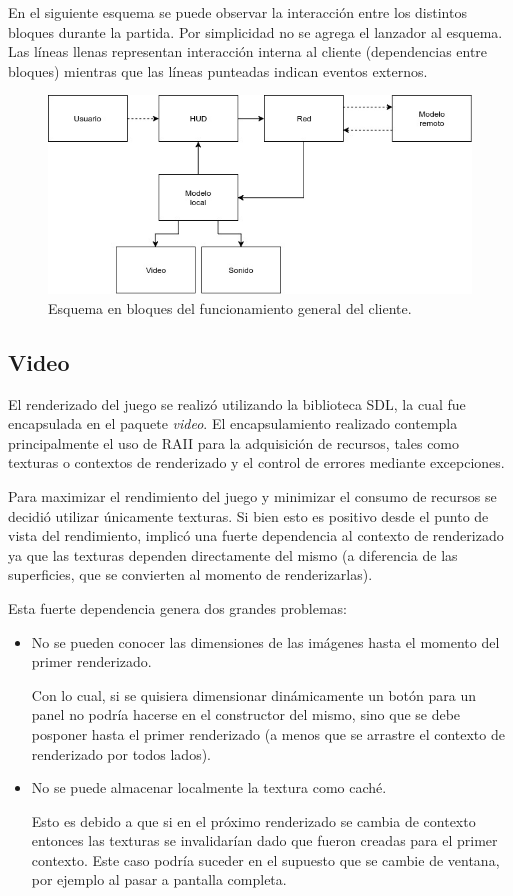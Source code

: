 \documentclass[titlepage,a4paper,12pt]{article}
\begin{document}
En el siguiente esquema se puede observar la interacción entre los distintos bloques durante la partida. Por simplicidad no se agrega el lanzador al esquema. Las líneas llenas representan interacción interna al cliente (dependencias entre bloques) mientras que las líneas punteadas indican eventos externos.
\begin{figure}[H]
	\centering
	\includegraphics[width=16cm]{../imagenes/esquema-bloques-cliente.jpg}
	\caption{\label{fig:esquema-bloques-cliente} Esquema en bloques del funcionamiento general del cliente.}
\end{figure}

\subsection{Video}
El renderizado del juego se realizó utilizando la biblioteca SDL, la cual fue encapsulada en el paquete \textit{video}. El encapsulamiento realizado contempla principalmente el uso de RAII para la adquisición de recursos, tales como texturas o contextos de renderizado y el control de errores mediante excepciones.

Para maximizar el rendimiento del juego y minimizar el consumo de recursos se decidió utilizar únicamente texturas. Si bien esto es positivo desde el punto de vista del rendimiento, implicó una fuerte dependencia al contexto de renderizado ya que las texturas dependen directamente del mismo (a diferencia de las superficies, que se convierten al momento de renderizarlas).  

Esta fuerte dependencia genera dos grandes problemas:
\begin{itemize}
\item No se pueden conocer las dimensiones de las imágenes hasta el momento del primer renderizado.

Con lo cual, si se quisiera dimensionar dinámicamente un botón para un panel no podría hacerse en el constructor del mismo, sino que se debe posponer hasta el primer renderizado (a menos que se arrastre el contexto de renderizado por todos lados).

\item No se puede almacenar localmente la textura como caché.

Esto es debido a que si en el próximo renderizado se cambia de contexto entonces las texturas se invalidarían dado que fueron creadas para el primer contexto. Este caso podría suceder en el supuesto que se cambie de ventana, por ejemplo al pasar a pantalla completa.
\end{itemize}
\end{document}
